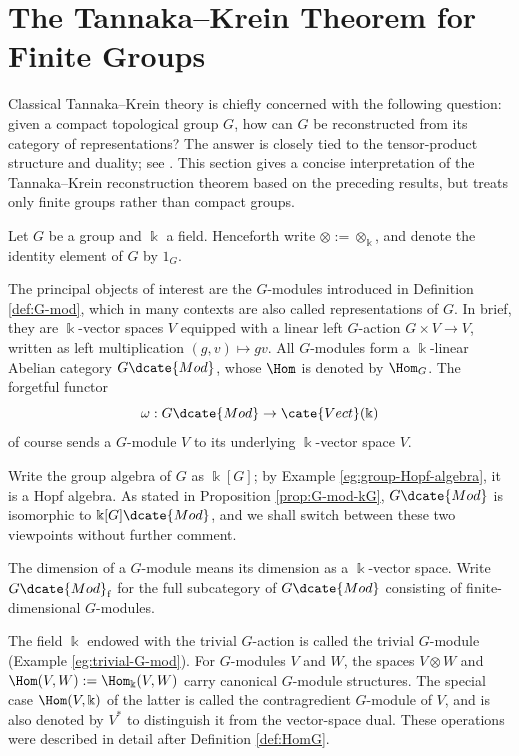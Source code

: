\section{The Tannaka--Krein Theorem for Finite Groups}\label{sec:TK}
Classical Tannaka--Krein theory \cite{Ta38, Kr49} is chiefly concerned with the following question: given a compact topological group $G$, how can $G$ be reconstructed from its category of representations? The answer is closely tied to the tensor-product structure and duality; see \cite[\S 4.3]{FL14}. This section gives a concise interpretation of the Tannaka--Krein reconstruction theorem based on the preceding results, but treats only finite groups rather than compact groups.

Let $G$ be a group and $\Bbbk$ a field. Henceforth write $\otimes := \otimes_{\Bbbk}$, and denote the identity element of $G$ by $1_G$.

The principal objects of interest are the $G$-modules introduced in Definition \ref{def:G-mod}, which in many contexts are also called representations of $G$. In brief, they are $\Bbbk$-vector spaces $V$ equipped with a linear left $G$-action $G \times V \to V$, written as left multiplication $(g,v)\mapsto gv$. All $G$-modules form a $\Bbbk$-linear Abelian category $G\dcate{Mod}$, whose $\Hom$ is denoted by $\Hom_G$. The forgetful functor
\[ \omega: G\dcate{Mod} \to \cate{Vect}(\Bbbk) \]
of course sends a $G$-module $V$ to its underlying $\Bbbk$-vector space $V$.

Write the group algebra of $G$ as $\Bbbk[G]$; by Example \ref{eg:group-Hopf-algebra}, it is a Hopf algebra. As stated in Proposition \ref{prop:G-mod-kG}, $G\dcate{Mod}$ is isomorphic to $\Bbbk[G]\dcate{Mod}$, and we shall switch between these two viewpoints without further comment.

\begin{convention}
	The dimension of a $G$-module means its dimension as a $\Bbbk$-vector space. Write $G\dcate{Mod}_{\mathrm{f}}$ for the full subcategory of $G\dcate{Mod}$ consisting of finite-dimensional $G$-modules.
\end{convention}

The field $\Bbbk$ endowed with the trivial $G$-action is called the trivial $G$-module (Example \ref{eg:trivial-G-mod}). For $G$-modules $V$ and $W$, the spaces $V\otimes W$ and $\Hom(V,W):=\Hom_{\Bbbk}(V,W)$ carry canonical $G$-module structures. The special case $\Hom(V,\Bbbk)$ of the latter is called the contragredient $G$-module of $V$, and is also denoted by $V^*$ to distinguish it from the vector-space dual. These operations were described in detail after Definition \ref{def:HomG}.

